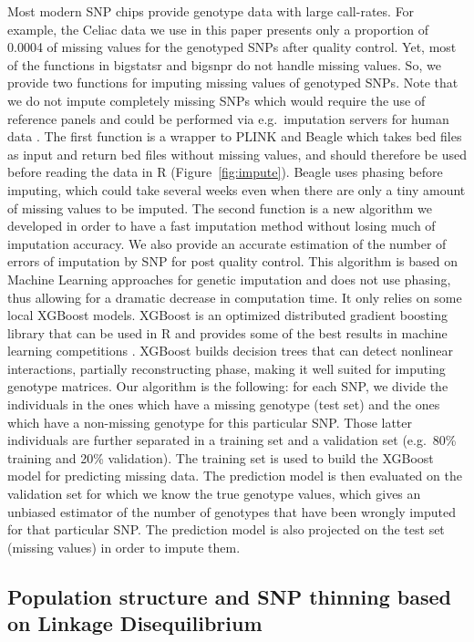 \documentclass{bioinfo}
\begin{document}
\begin{methods}
{Most modern SNP chips provide genotype data with large call-rates. For example, the Celiac data we use in this paper presents only a proportion of 0.0004 of missing values for the genotyped SNPs after quality control. Yet, most of the functions in bigstatsr and bigsnpr do not handle missing values.
So, we provide two functions for imputing missing values of genotyped SNPs. Note that we do not impute completely missing SNPs which would require the use of reference panels and could be performed via e.g.\ imputation servers for human data \cite[]{mccarthy2016reference}. The first function is a wrapper to PLINK and Beagle \cite[]{Browning2009} which takes bed files as input and return bed files without missing values, and should therefore be used before reading the data in R (Figure~\ref{fig:impute}). Beagle uses phasing before imputing, which could take several weeks even when there are only a tiny amount of missing values to be imputed. The second function is a new algorithm we developed in order to have a fast imputation method without losing much of imputation accuracy. We also provide an accurate estimation of the number of errors of imputation by SNP for post quality control.
This algorithm is based on Machine Learning approaches for genetic imputation \cite[]{Wang2012} and does not use phasing, thus allowing for a dramatic decrease in computation time. It only relies on some local XGBoost models. XGBoost is an optimized distributed gradient boosting library that can be used in R and provides some of the best results in machine learning competitions \cite[]{Chen2016}.
XGBoost builds decision trees that can detect nonlinear interactions, partially reconstructing phase, making it well suited for imputing genotype matrices. 
Our algorithm is the following: for each SNP, we divide the individuals in the ones which have a missing genotype (test set) and the ones which have a non-missing genotype for this particular SNP. Those latter individuals are further separated in a training set and a validation set (e.g.\ 80\% training and 20\% validation). The training set is used to build the XGBoost model for predicting missing data. The prediction model is then evaluated on the validation set for which we know the true genotype values, which gives an unbiased estimator of the number of genotypes that have been wrongly imputed for that particular SNP. The prediction model is also projected on the test set (missing values) in order to impute them.
}



\subsection{Population structure and SNP thinning based on Linkage Disequilibrium} 




\end{methods}
\end{document}

